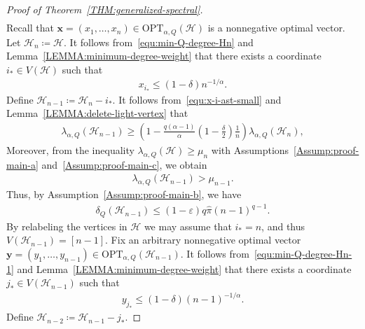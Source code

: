 \documentclass[11pt,a4paper]{article}
\begin{document}
\begin{proof}[Proof of Theorem~\ref{THM:generalized-spectral}]
\begin{align}
    \end{align}
    Recall that $\mathbf{x} = (x_1, \ldots, x_{n}) \in \mathrm{OPT}_{\alpha, Q}(\mathcal{H})$ is a nonnegative optimal vector. 
    Let $\mathcal{H}_{n} \coloneqq \mathcal{H}$. 
    It follows from~\eqref{equ:min-Q-degree-Hn} and Lemma~\ref{LEMMA:minimum-degree-weight} that there exists a coordinate $i_{\ast} \in V(\mathcal{H})$ such that 
    \begin{align}\label{equ:x-i-ast-small}
        x_{i_{\ast}} \le (1-\delta)n^{-1/\alpha}. 
    \end{align}
    Define $\mathcal{H}_{n-1} \coloneqq \mathcal{H}_{n} - i_{\ast}$. 
    It follows from~\eqref{equ:x-i-ast-small} and Lemma~\ref{LEMMA:delete-light-vertex} that 
    \begin{align*}%
        \lambda_{\alpha, Q}(\mathcal{H}_{n-1})
        \ge \left(1-\frac{q(\alpha-1)}{\alpha}\left(1-\frac{\delta}{2}\right) \frac{1}{n}\right) \lambda_{\alpha, Q}(\mathcal{H}_{n}),
    \end{align*}
    Moreover, from the inequality $\lambda_{\alpha, Q}(\mathcal{H}) \ge \mu_n$ with Assumptions~\ref{Assump:proof-main-a} and~\ref{Assump:proof-main-c}, we obtain 
    \begin{align*}%
        \lambda_{\alpha, Q}(\mathcal{H}_{n-1})
        > \mu_{n-1}. 
    \end{align*}
    Thus, by Assumption~\ref{Assump:proof-main-b}, we have  
    \begin{align}\label{equ:min-Q-degree-Hn-1}
        \delta_{Q}(\mathcal{H}_{n-1})
        \le (1-\varepsilon) q \hat{\pi}  (n-1)^{q-1}. 
    \end{align}
    By relabeling the vertices in $\mathcal{H}$ we may assume that $i_{\ast} = n$, and thus $V(\mathcal{H}_{n-1}) = [n-1]$. 
    Fix an arbitrary nonnegative optimal vector $\mathbf{y} = (y_1, \ldots, y_{n-1}) \in \mathrm{OPT}_{\alpha, Q}(\mathcal{H}_{n-1})$.
    It follows from~\eqref{equ:min-Q-degree-Hn-1} and Lemma~\ref{LEMMA:minimum-degree-weight} that there exists a coordinate $j_{\ast} \in V(\mathcal{H}_{n-1})$ such that 
    \begin{align}\label{equ:y-j-ast-small}
        y_{j_{\ast}} \le (1-\delta)(n-1)^{-1/\alpha}.
    \end{align}
    Define $\mathcal{H}_{n-2} \coloneqq \mathcal{H}_{n-1} - j_{\ast}$. 

\end{proof}
\end{document}
